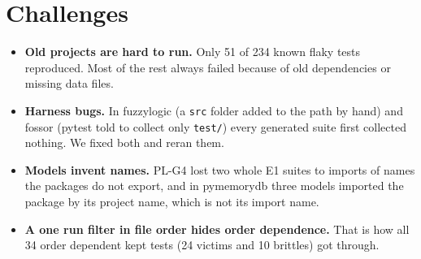 \documentclass[sigconf,nonacm]{acmart}
\begin{document}
\section{Challenges}
\begin{itemize}
\item \textbf{Old projects are hard to run.} Only 51 of 234 known flaky tests reproduced. Most of the rest always failed because of old dependencies or missing data files.
\item \textbf{Harness bugs.} In fuzzylogic (a \texttt{src} folder added to the path by hand) and fossor (pytest told to collect only \texttt{test/}) every generated suite first collected nothing. We fixed both and reran them.
\item \textbf{Models invent names.} PL-G4 lost two whole E1 suites to imports of names the packages do not export, and in pymemorydb three models imported the package by its project name, which is not its import name.
\item \textbf{A one run filter in file order hides order dependence.} That is how all 34 order dependent kept tests (24 victims and 10 brittles) got through.
\end{itemize}
\end{document}
